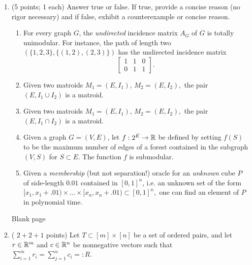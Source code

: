 \documentclass[12pt]{article}
\begin{document}
\begin{enumerate}
\item (5 points; 1 each) Answer true or false. If true, provide a concise reason (no rigor necessary) and if false, exhibit a counterexample or concise reason.
\begin{enumerate}
\item For every graph $G$, the \emph{undirected} incidence matrix $A_G$ of $G$ is totally unimodular. For instance, the path of length two $(\{1,2,3\}, \{(1,2), (2,3)\})$ has the undirected incidence matrix
$$ \begin{bmatrix}
1 & 1 & 0 \\
0 & 1 & 1
\end{bmatrix}. $$
\item Given two matroids $M_1 = (E, I_1)$, $M_2 = (E, I_2),$ the pair $(E, I_1 \cup I_2)$ is a matroid.
\item Given two matroids $M_1 = (E, I_1)$, $M_2 = (E, I_2),$ the pair $(E, I_1 \cap I_2)$ is a matroid.
\item Given a graph $G = (V, E)$, let $f:2^E \to {\mathbb R}$ be defined by setting $f(S)$ to be the maximum number of edges of a forest contained in the subgraph $(V, S)$ for $S \subset E$. The function $f$ is submodular.
\item Given a \emph{membership} (but not separation!) oracle for an \emph{unknown} cube $P$ of side-length $0.01$ contained in $[0,1]^n$, i.e. an unknown set of the form $[x_1 , x_1 + .01)\times  \dots \times [x_n, x_n + .01)\subset [0,1]^n,$ one can find an element of $P$ in polynomial time. \end{enumerate}

\newpage
Blank page
\newpage

\item ( $2 + 2 +1$ points) Let $T \subset [m]\times[n]$ be a set of ordered pairs, and let $r \in {\mathbb R}^m$ and $c \in {\mathbb R}^n$ be nonnegative vectors such that $\sum_{i = 1}^m r_i = \sum_{j = 1}^n c_i=:R$. 


\end{enumerate}
\end{document}
